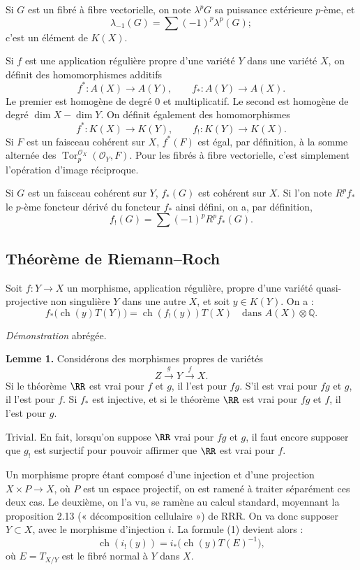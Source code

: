 \documentclass[11pt]{article}
\newcommand{\ch}{\operatorname{ch}}
\newcommand{\Tor}{\operatorname{Tor}}
\newcommand{\RRR}{\mathrm{RRR}}
\providecommand{\ch}{\operatorname{ch}}
\providecommand{\Tor}{\operatorname{Tor}}
\begin{document}
Si \(G\) est un fibré à fibre vectorielle, on note \(\lambda^pG\) sa puissance extérieure \(p\)-ème, et
\[
  \lambda_{-1}(G)=\sum(-1)^p\lambda^p(G);
\]
c'est un élément de \(K(X)\).

Si \(f\) est une application régulière propre d'une variété \(Y\) dans une variété \(X\), on définit des homomorphismes additifs
\[
  f^*:A(X)\longrightarrow A(Y),\qquad
  f_*:A(Y)\longrightarrow A(X).
\]
Le premier est homogène de degré \(0\) et multiplicatif. Le second est homogène de degré \(\dim X-\dim Y\). On définit également des homomorphismes
\[
  f^*:K(X)\longrightarrow K(Y),\qquad
  f_!:K(Y)\longrightarrow K(X).
\]
Si \(F\) est un faisceau cohérent sur \(X\), \(f^*(F)\) est égal, par définition, à la somme alternée des \(\Tor_p^{\mathcal O_X}(\mathcal O_Y,F)\). Pour les fibrés à fibre vectorielle, c'est simplement l'opération d'image réciproque.

Si \(G\) est un faisceau cohérent sur \(Y\), \(f_*(G)\) est cohérent sur \(X\). Si l'on note \(R^pf_*\) le \(p\)-ème foncteur dérivé du foncteur \(f_*\) ainsi défini, on a, par définition,
\[
  f_!(G)=\sum(-1)^p R^pf_*(G).
\]

\subsection*{Théorème de Riemann--Roch}
Soit \(f:Y\to X\) un morphisme, application régulière, propre d'une variété quasi-projective non singulière \(Y\) dans une autre \(X\), et soit \(y\in K(Y)\). On a :
\begin{equation}\tag{1}
  f_*\bigl(\ch(y)T(Y)\bigr)=\ch(f_!(y))T(X)
  \quad\text{dans } A(X)\otimes\mathbb Q.
\end{equation}

\emph{Démonstration} abrégée.

\textbf{Lemme 1.} Considérons des morphismes propres de variétés
\[
  Z \xrightarrow{g} Y \xrightarrow{f} X.
\]
Si le théorème \(\RR\) est vrai pour \(f\) et \(g\), il l'est pour \(fg\). S'il est vrai pour \(fg\) et \(g\), il l'est pour \(f\). Si \(f_*\) est injective, et si le théorème \(\RR\) est vrai pour \(fg\) et \(f\), il l'est pour \(g\).

Trivial. En fait, lorsqu'on suppose \(\RR\) vrai pour \(fg\) et \(g\), il faut encore supposer que \(g_!\) est surjectif pour pouvoir affirmer que \(\RR\) est vrai pour \(f\).

Un morphisme propre étant composé d'une injection et d'une projection \(X\times P\to X\), où \(P\) est un espace projectif, on est ramené à traiter séparément ces deux cas. Le deuxième, on l'a vu, se ramène au calcul standard, moyennant la proposition 2.13 (« décomposition cellulaire ») de \(\RRR\). On va donc supposer \(Y\subset X\), avec le morphisme d'injection \(i\). La formule (1) devient alors :
\begin{equation}\tag{2}
  \ch(i_!(y))=i_*\bigl(\ch(y)T(E)^{-1}\bigr),
\end{equation}
où \(E=T_{X/Y}\) est le fibré normal à \(Y\) dans \(X\).
\end{document}
